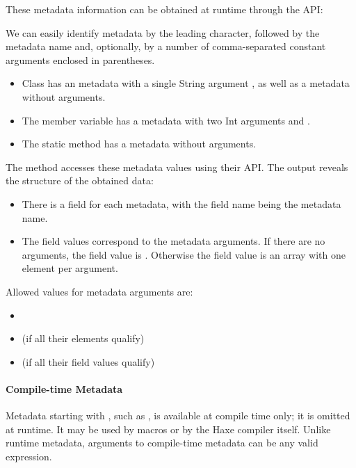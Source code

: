 These metadata information can be obtained at runtime through the  API:


We can easily identify metadata by the leading  character, followed by the metadata name and, optionally, by a number of comma-separated constant arguments enclosed in parentheses.

\begin{itemize}
	\item Class  has an  metadata with a single String argument , as well as a  metadata without arguments.
	\item The member variable  has a  metadata with two Int arguments  and .
	\item The static method  has a  metadata without arguments.
\end{itemize}

The  method accesses these metadata values using their API. The output reveals the structure of the obtained data:

\begin{itemize}
	\item There is a field for each metadata, with the field name being the metadata name.
	\item The field values correspond to the metadata arguments. If there are no arguments, the field value is . Otherwise the field value is an array with one element per argument.
\end{itemize}

Allowed values for metadata arguments are:

\begin{itemize}
	\item {}
	\item {} (if all their elements qualify)
	\item {} (if all their field values qualify)
\end{itemize}

\paragraph{Compile-time Metadata}

Metadata starting with \expr{:}, such as , is available at compile time only; it is omitted at runtime. It may be used by macros or by the Haxe compiler itself. Unlike runtime metadata, arguments to compile-time metadata can be any valid expression.

